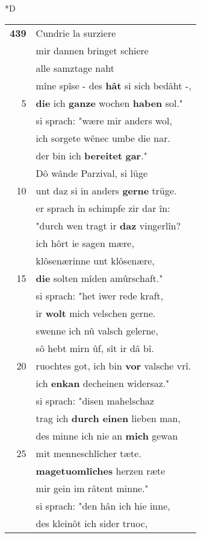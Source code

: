 \documentclass[8pt,a4paper,notitlepage]{article}
\begin{document}
\begin{table}[ht]
\begin{minipage}[t]{0.5\linewidth}
\small
\begin{center}*D
\end{center}
\begin{tabular}{rl}
\textbf{439} & Cundrie la surziere\\ 
 & mir dannen bringet schiere\\ 
 & alle samztage naht\\ 
 & mîne spîse - des \textbf{hât} si sich bedâht -,\\ 
5 & \textbf{die} ich \textbf{ganze} wochen \textbf{haben} sol."\\ 
 & si sprach: "wære mir anders wol,\\ 
 & ich sorgete wênec umbe die nar.\\ 
 & der bin ich \textbf{bereitet} \textbf{gar}."\\ 
 & Dô wânde Parzival, si lüge\\ 
10 & unt daz si in anders \textbf{gerne} trüge.\\ 
 & er sprach in schimpfe zir dar în:\\ 
 & "durch wen tragt ir \textbf{daz} vingerlîn?\\ 
 & ich hôrt ie sagen mære,\\ 
 & klôsenærinne unt klôsenære,\\ 
15 & \textbf{die} solten mîden amûrschaft."\\ 
 & si sprach: "het iwer rede kraft,\\ 
 & ir \textbf{wolt} mich velschen gerne.\\ 
 & swenne ich nû valsch gelerne,\\ 
 & sô hebt mirn ûf, sît ir dâ bî.\\ 
20 & ruochtes got, ich bin \textbf{vor} valsche vrî.\\ 
 & ich \textbf{enkan} decheinen widersaz."\\ 
 & si sprach: "disen mahelschaz\\ 
 & trag ich \textbf{durch einen} lieben man,\\ 
 & des minne ich nie an \textbf{mich} gewan\\ 
25 & mit menneschlîcher tæte.\\ 
 & \textbf{magetuomlîches} herzen ræte\\ 
 & mir gein im râtent minne."\\ 
 & si sprach: "den hân ich hie inne,\\ 
 & des kleinôt ich sider truoc,\\ 

\end{tabular}
\end{minipage}
\end{table}
\end{document}
